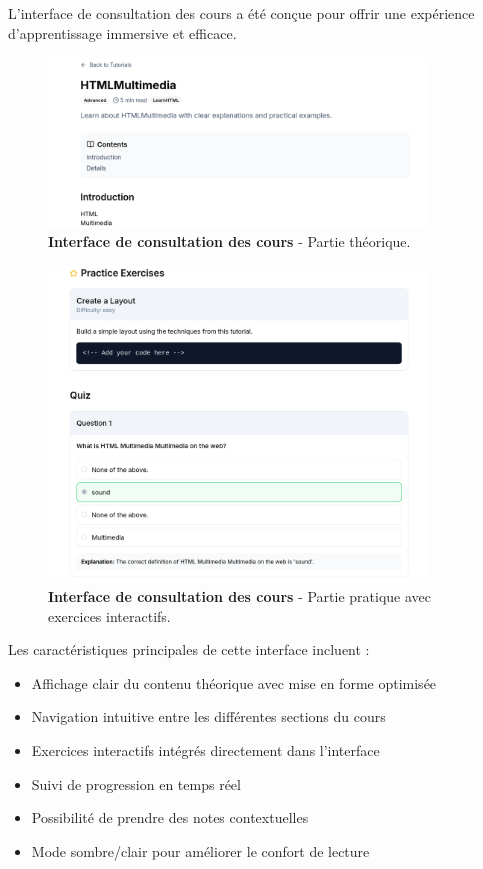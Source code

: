 L'interface de consultation des cours a été conçue pour offrir une expérience d'apprentissage immersive et efficace.

\begin{figure}[h!]
  \centering
  \includegraphics[width=0.9\textwidth,keepaspectratio]{week_3_img/part1.png}
  \caption{\textbf{Interface de consultation des cours} - Partie théorique.}
  \label{fig:course_view_part1}
\end{figure}

\begin{figure}[h!]
  \centering
  \includegraphics[width=0.9\textwidth,keepaspectratio]{week_3_img/part2.png}
  \caption{\textbf{Interface de consultation des cours} - Partie pratique avec exercices interactifs.}
  \label{fig:course_view_part2}
\end{figure}

Les caractéristiques principales de cette interface incluent :
\begin{itemize}
  \item Affichage clair du contenu théorique avec mise en forme optimisée
  \item Navigation intuitive entre les différentes sections du cours
  \item Exercices interactifs intégrés directement dans l'interface
  \item Suivi de progression en temps réel
  \item Possibilité de prendre des notes contextuelles
  \item Mode sombre/clair pour améliorer le confort de lecture
\end{itemize}

